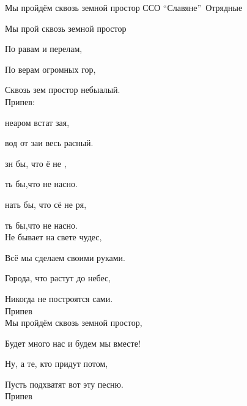 \documentclass[11pt,a5paper]{book}
\renewcommand{\tt}{\indent \indent}
\begin{document}
\begin{song}{Мы пройдём сквозь земной простор ССО “Славяне”}{}{~}{Отрядные}{}{}

Мы прой сквозь земной простор\par
По равам и перелам,\par
По верам огромных гор,\par
Сквозь зем простор небыалый.\\

Припев:\par
{} неаром встат зая,\par
{}вод от заи весь расный.\par
{} зн бы, что ё не ,\par
{} ть бы,что не насно.\par
{} нать бы, что сё не ря,\par
{} ть бы,что не насно.\\

Не бывает на свете чудес,\par
Всё мы сделаем своими руками.\par
Города, что растут до небес,\par
Никогда не построятся сами.\\

Припев\\

Мы пройдём сквозь земной простор,\par
Будет много нас и будем мы вместе!\par
Ну, а те, кто придут потом,\par
Пусть подхватят вот эту песню.\\

Припев\\

\end{song}
\end{document}
